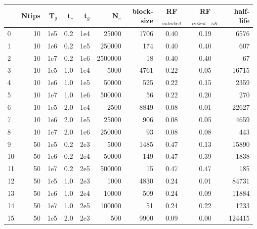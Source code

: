 \documentclass[11pt]{article}
\begin{document}
\begin{table}
\begin{center}
\begin{tabular}{lrrr|rr|rccr}

\toprule
{} &  Ntips &    T$_g$ &  t$_c$ &  t$_g$ &  N$_e$ &  block-size &  RF$_{unlinked}$ &  RF$_{linked-5K}$ &  half-life \\
\midrule
0  &     10 &    1e5 &    0.2 &  1e4 &    25000 &     1706 &      0.40 &         0.19 &     6576 \\
1  &     10 &    1e6 &    0.2 &  1e5 &   250000 &      174 &      0.40 &         0.40 &      607 \\
2  &     10 &    1e7 &    0.2 &  1e6 &  2500000 &       18 &      0.40 &         0.40 &       67 \\
3  &     10 &    1e5 &    1.0 &  1e4 &     5000 &     4761 &      0.22 &         0.05 &    16715 \\
4  &     10 &    1e6 &    1.0 &  1e5 &    50000 &      525 &      0.22 &         0.15 &     2359 \\
5  &     10 &    1e7 &    1.0 &  1e6 &   500000 &       56 &      0.22 &         0.20 &      270 \\
6  &     10 &    1e5 &    2.0 &  1e4 &     2500 &     8849 &      0.08 &         0.01 &    22627 \\
7  &     10 &    1e6 &    2.0 &  1e5 &    25000 &      906 &      0.08 &         0.05 &     4659 \\
8  &     10 &    1e7 &    2.0 &  1e6 &   250000 &       93 &      0.08 &         0.08 &      443 \\
9  &     50 &    1e5 &    0.2 &  2e3 &     5000 &     1485 &      0.47 &         0.13 &    15890 \\
10 &     50 &    1e6 &    0.2 &  2e4 &    50000 &      149 &      0.47 &         0.39 &     1838 \\
11 &     50 &    1e7 &    0.2 &  2e5 &   500000 &       15 &      0.47 &         0.47 &      185 \\
12 &     50 &    1e5 &    1.0 &  2e3 &     1000 &     4830 &      0.24 &         0.01 &    84731 \\
13 &     50 &    1e6 &    1.0 &  2e4 &    10000 &      509 &      0.24 &         0.09 &    11884 \\
14 &     50 &    1e7 &    1.0 &  2e5 &   100000 &       51 &      0.24 &         0.22 &     1233 \\
15 &     50 &    1e5 &    2.0 &  2e3 &      500 &     9900 &      0.09 &         0.00 &   124415 \\

\end{tabular}
\end{center}
\end{table}
\end{document}
